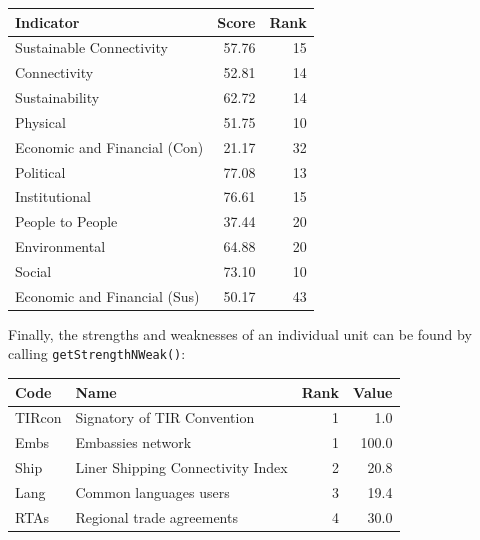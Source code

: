\documentclass[
]{book}
\newenvironment{Shaded}{\begin{snugshade}}{\end{snugshade}}
\newcommand{\AttributeTok}[1]{\textcolor[rgb]{0.77,0.63,0.00}{#1}}
\newcommand{\FunctionTok}[1]{\textcolor[rgb]{0.00,0.00,0.00}{#1}}
\newcommand{\NormalTok}[1]{#1}
\newcommand{\OtherTok}[1]{\textcolor[rgb]{0.56,0.35,0.01}{#1}}
\newcommand{\SpecialCharTok}[1]{\textcolor[rgb]{0.00,0.00,0.00}{#1}}
\newcommand{\StringTok}[1]{\textcolor[rgb]{0.31,0.60,0.02}{#1}}
\begin{document}
\begin{tabular}{l|r|r}
\hline
Indicator & Score & Rank\\
\hline
Sustainable Connectivity & 57.76 & 15\\
\hline
Connectivity & 52.81 & 14\\
\hline
Sustainability & 62.72 & 14\\
\hline
Physical & 51.75 & 10\\
\hline
Economic and Financial (Con) & 21.17 & 32\\
\hline
Political & 77.08 & 13\\
\hline
Institutional & 76.61 & 15\\
\hline
People to People & 37.44 & 20\\
\hline
Environmental & 64.88 & 20\\
\hline
Social & 73.10 & 10\\
\hline
Economic and Financial (Sus) & 50.17 & 43\\
\hline
\end{tabular}

Finally, the strengths and weaknesses of an individual unit can be found by calling \texttt{getStrengthNWeak()}:

\begin{Shaded}
\end{Shaded}

\begin{tabular}{l|l|r|r}
\hline
Code & Name & Rank & Value\\
\hline
TIRcon & Signatory of TIR Convention & 1 & 1.0\\
\hline
Embs & Embassies network & 1 & 100.0\\
\hline
Ship & Liner Shipping Connectivity Index & 2 & 20.8\\
\hline
Lang & Common languages users & 3 & 19.4\\
\hline
RTAs & Regional trade agreements & 4 & 30.0\\
\hline
\end{tabular}

\begin{Shaded}
\end{Shaded}
\end{document}
